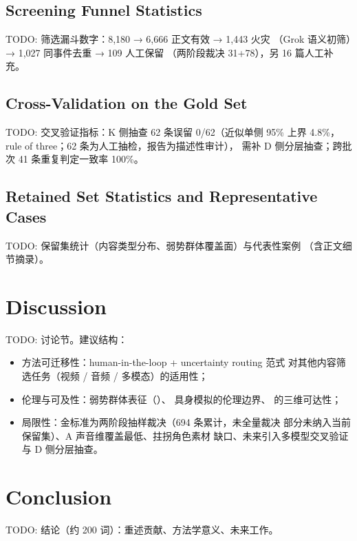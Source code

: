 \documentclass[manuscript,review,anonymous]{acmart}
\begin{document}
\subsection{Screening Funnel Statistics}
TODO: 筛选漏斗数字：8,180 → 6,666 正文有效 → 1,443 火灾
（Grok 语义初筛）→ 1,027 同事件去重 → 109 人工保留
（两阶段裁决 31+78），另 16 篇人工补充。

\subsection{Cross-Validation on the Gold Set}
TODO: 交叉验证指标：K 侧抽查 62 条误留 0/62（近似单侧 95\% 上界
4.8\%，rule of three；62 条为人工抽检，报告为描述性审计），
需补 D 侧分层抽查；跨批次 41 条重复判定一致率 100\%。

\subsection{Retained Set Statistics and Representative Cases}
TODO: 保留集统计（内容类型分布、弱势群体覆盖面）与代表性案例
（含正文细节摘录）。

\section{Discussion}
\label{sec:discussion}
TODO: 讨论节。建议结构：
\begin{itemize}
  \item 方法可迁移性：human-in-the-loop + uncertainty routing 范式
        对其他内容筛选任务（视频 / 音频 / 多模态）的适用性；
  \item 伦理与可及性：弱势群体表征（\cite{tigwell2021}）、
        具身模拟的伦理边界、\cite{equitable2025} 的三维可达性；
  \item 局限性：金标准为两阶段抽样裁决（694 条累计，未全量裁决
        部分未纳入当前保留集）、A 声音维覆盖最低、拄拐角色素材
        缺口、未来引入多模型交叉验证与 D 侧分层抽查。
\end{itemize}

\section{Conclusion}
\label{sec:conclusion}
TODO: 结论（约 200 词）：重述贡献、方法学意义、未来工作。



\end{document}
